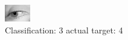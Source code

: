 \begin{figure}[h!]
\begin{center}
\includegraphics[width=0.60\columnwidth]{figures/ID2935_class_3_target_4.png}
\end{center}
\caption{ Classification: 3 actual target: 4}
\label{fig:ID2935_class_3_target_4}
\end{figure}
